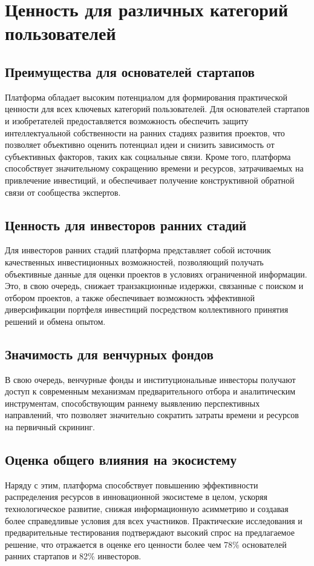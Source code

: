 \documentclass[
    candidate, %
    subf, %
    dotsinheaders=false,
]{disser}
\begin{document}
\section{Ценность для различных категорий пользователей}

\subsection{Преимущества для основателей стартапов}
Платформа обладает высоким потенциалом для формирования практической ценности для всех ключевых категорий пользователей. Для основателей стартапов и изобретателей предоставляется возможность обеспечить защиту интеллектуальной собственности на ранних стадиях развития проектов, что позволяет объективно оценить потенциал идеи и снизить зависимость от субъективных факторов, таких как социальные связи. Кроме того, платформа способствует значительному сокращению времени и ресурсов, затрачиваемых на привлечение инвестиций, и обеспечивает получение конструктивной обратной связи от сообщества экспертов.

\subsection{Ценность для инвесторов ранних стадий}
Для инвесторов ранних стадий платформа представляет собой источник качественных инвестиционных возможностей, позволяющий получать объективные данные для оценки проектов в условиях ограниченной информации. Это, в свою очередь, снижает транзакционные издержки, связанные с поиском и отбором проектов, а также обеспечивает возможность эффективной диверсификации портфеля инвестиций посредством коллективного принятия решений и обмена опытом.

\subsection{Значимость для венчурных фондов}
В свою очередь, венчурные фонды и институциональные инвесторы получают доступ к современным механизмам предварительного отбора и аналитическим инструментам, способствующим раннему выявлению перспективных направлений, что позволяет значительно сократить затраты времени и ресурсов на первичный скрининг.

\subsection{Оценка общего влияния на экосистему}
Наряду с этим, платформа способствует повышению эффективности распределения ресурсов в инновационной экосистеме в целом, ускоряя технологическое развитие, снижая информационную асимметрию и создавая более справедливые условия для всех участников. Практические исследования и предварительные тестирования подтверждают высокий спрос на предлагаемое решение, что отражается в оценке его ценности более чем 78\% основателей ранних стартапов и 82\% инвесторов.
\end{document}

